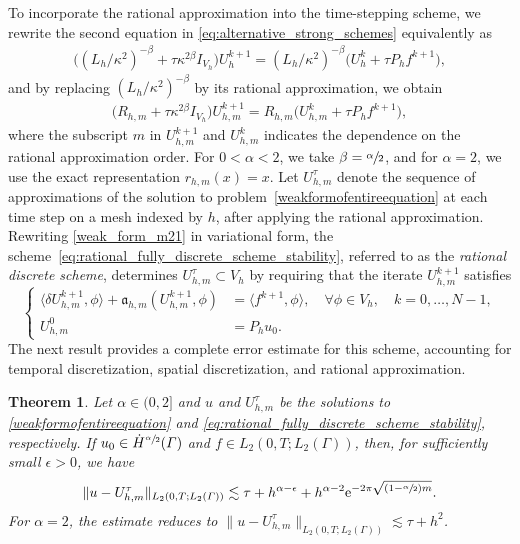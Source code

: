 \documentclass[numbers,webpdf]{ima-authoring-template}%
\theoremstyle{thmstyletwo}%
\newtheorem{theorem}{Theorem}%
\numberwithin{equation}{section}
\begin{document}
To incorporate the rational approximation into the time-stepping scheme, we rewrite the second equation in \eqref{eq:alternative_strong_schemes} equivalently as
\begin{align}
\label{weak_form_m2}
    \big((L_h/\kappa^2)^{-\beta}
    +\tau\kappa^{2\beta}I_{V_h}\big)U_h^{k+1}
    =(L_h/\kappa^2)^{-\beta}
    \big(U_h^k+\tau P_hf^{k+1}\big),
\end{align}
and by replacing $(L_h/\kappa^2)^{-\beta}$ by its rational approximation, we obtain
\begin{align}
\label{weak_form_m21}
    \big(R_{h,m}+\tau\kappa^{2\beta}I_{V_h}\big)U_{h,m}^{k+1}
    =R_{h,m}\big(U_{h,m}^k+\tau P_hf^{k+1}\big),
\end{align}
where the subscript $m$ in $U_{h,m}^{k+1}$ and $U_{h,m}^{k}$ indicates the dependence on the rational approximation order. For $0<\alpha<2$, we take $\beta=\sfrac{\alpha}{2}$, and for $\alpha=2$, we use the exact representation $r_{h,m}(x)=x$. Let $U_{h,m}^\tau$ denote the sequence of approximations of the solution to problem~\eqref{weakformofentireequation} at each time step on a mesh indexed by $h$, after applying the rational approximation. Rewriting \eqref{weak_form_m21} in variational form, the scheme~\eqref{eq:rational_fully_discrete_scheme_stability}, referred to as the \emph{rational discrete scheme}, determines $U_{h,m}^{\tau}\subset V_h$ by requiring that the iterate $U_{h,m}^{k+1}$ satisfies
\begin{equation}
\label{eq:rational_fully_discrete_scheme_stability}
\left\{
\begin{aligned}
    \langle\delta U_{h,m}^{k+1},\phi\rangle + \mathfrak{a}_{h,m}(U_{h,m}^{k+1},\phi) &= \langle f^{k+1},\phi\rangle, \quad\forall\phi\in V_h,\quad k=0,\dots, N-1, \\
    U^0_{h,m} &= P_hu_0.
\end{aligned}
\right.
\end{equation}
The next result provides a complete error estimate for this scheme, accounting for temporal discretization, spatial discretization, and rational approximation.
\begin{theorem} 
\label{lastlasttheorem}
Let $\alpha\in(0,2]$ and $u$ and $U_{h,m}^{\tau}$ be the solutions to \eqref{weakformofentireequation} and \eqref{eq:rational_fully_discrete_scheme_stability}, respectively. If $u_0\in\dot{H}^{\sfrac{\alpha}{2}}({\mit\varGamma})$ and $f\in L_2(0,T;L_2(\Gamma))$, then, for sufficiently small $\epsilon>0$, we have
\begin{align}
    \label{finalfinalest}
        \|u-U_{h,m}^\tau\|_{L_2(0,T;L_2({\mit\varGamma}))}\lesssim\tau+h^{\alpha-\epsilon}+ h^{\alpha-2}\mathrm{e}^{-2\pi\sqrt{(1-\sfrac{\alpha}{2})m}}.
    \end{align}
    For $\alpha=2$, the estimate reduces to $\|u-U_{h,m}^\tau\|_{L_2(0,T;L_2(\Gamma))} \lesssim \tau+h^2$.
\end{theorem}
\end{document}
